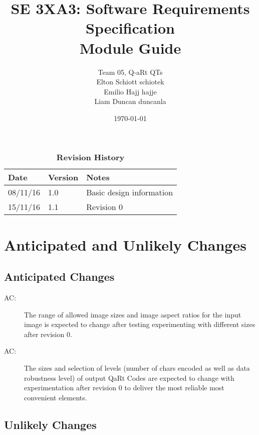 \documentclass[12pt, titlepage]{article}
\title{SE 3XA3: Software Requirements Specification\\Module Guide}
\author{Team 05, Q-aRt QTs 
\\Elton Schiott schiotek 
\\Emilio Hajj hajje 
\\Liam Duncan duncanla
}
\date{\today}
\newcounter{acnum}
\newcommand{\actheacnum}{AC\theacnum}
\begin{document}
\maketitle

\tableofcontents
\listoftables
\listoffigures

\begin{table}[bp]
\caption{\bf Revision History}
\begin{tabularx}{\textwidth}{p{3cm}p{2cm}X}
\toprule {\bf Date} & {\bf Version} & {\bf Notes}\\
\midrule
08/11/16 & 1.0 & Basic design information\\
15/11/16 & 1.1 & Revision 0\\

\bottomrule
\end{tabularx}
\end{table}

\newpage


\section{Anticipated and Unlikely Changes} \label{SecChange}


\subsection{Anticipated Changes} \label{SecAchange}


\begin{description}
\item[ \actheacnum \label{acInputImage}:] 
The range of allowed image sizes and image aspect ratios for the input image is expected to change after testing experimenting with different sizes after revision 0.

\item[ \actheacnum \label{QRCodeSizes}:] 
The sizes and selection of levels (number of chars encoded as well as data robustness level) of output QaRt Codes are expected to change with experimentation after revision 0 to deliver the most reliable most convenient elements.

\end{description}

\subsection{Unlikely Changes} \label{SecUchange}
\end{document}
